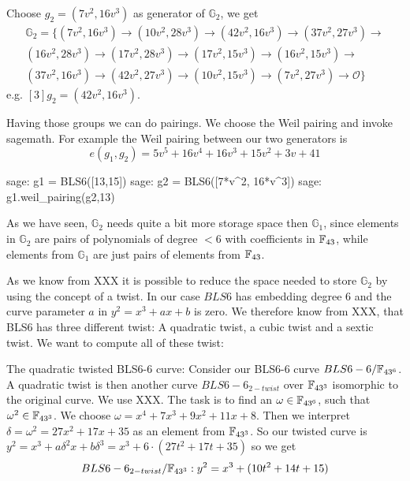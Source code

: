 Choose $g_2=(7v^2, 16v^3)$ as generator of $\mathbb{G}_2$, we get
\begin{multline*}
\mathbb{G}_2=\{
(7v^2, 16v^3) \to
(10v^2, 28v^3)\to
(42v^2, 16v^3)\to
(37v^2, 27v^3)\to\\
(16v^2, 28v^3)\to
(17v^2, 28v^3)\to
(17v^2, 15v^3)\to
(16v^2, 15v^3)\to\\
(37v^2, 16v^3)\to
(42v^2, 27v^3)\to
(10v^2, 15v^3)\to
(7v^2, 27v^3)\to
\mathcal{O}\}
\end{multline*}
e.g. $[3]g_2= (42v^2, 16v^3)$.

Having those groups we can do pairings. We choose the Weil pairing and invoke sagemath. For example the Weil pairing between our two generators is
$$
e(g_1,g_2)= 5v^5 + 16v^4 + 16v^3 + 15v^2 + 3v + 41
$$

\begin{sagecommandline}
sage: g1 = BLS6([13,15])
sage: g2 = BLS6([7*v^2, 16*v^3])
sage: g1.weil_pairing(g2,13)
\end{sagecommandline}

As we have seen, $\mathbb{G}_2$ needs quite a bit more storage space then $\mathbb{G}_1$, since elements in $\mathbb{G}_2$ are pairs of polynomials of degree $<6$ with coefficients in $\mathbb{F}_{43}$, while elements from $\mathbb{G}_1$ are just pairs of elements from $\mathbb{F}_{43}$. 

As we know from XXX it is possible to reduce the space needed to store $\mathbb{G}_2$ by using the concept of a twist. In our case $BLS6$ has embedding degree $6$ and the curve parameter $a$ in $y^2 = x^3 +ax + b$ is zero. We therefore know from XXX, that BLS6 has three different twist: A quadratic twist, a cubic twist and a sextic twist. We want to compute all of these twist:

The quadratic twisted BLS6-6 curve: Consider our BLS6-6 curve $BLS6-6/\mathbb{F}_{43^6}$. A quadratic twist is then another curve $BLS6-6_{2-twist}$ over $\mathbb{F}_{43^3}$ isomorphic to the original curve. We use XXX. The task is to find an $\omega\in \mathbb{F}_{43^6}$, such that $\omega^2 \in \mathbb{F}_{43^3}$. 
We choose $\omega = x^4 + 7x^3 + 9x^2 + 11x + 8$. Then we interpret $\delta = \omega^2 = 27x^2 + 17x + 35$ as an element from $\mathbb{F}_{43^3}$. So our twisted curve is
$y^2 = x^3+a\delta^2 x+b \delta^3 = x^3+6\cdot(27t^2+17t+35)$
so we get
$$
BLS6-6_{2-twist}/\mathbb{F}_{43^3}: y^2 = x^3+(10t^2+14t+15)
$$

